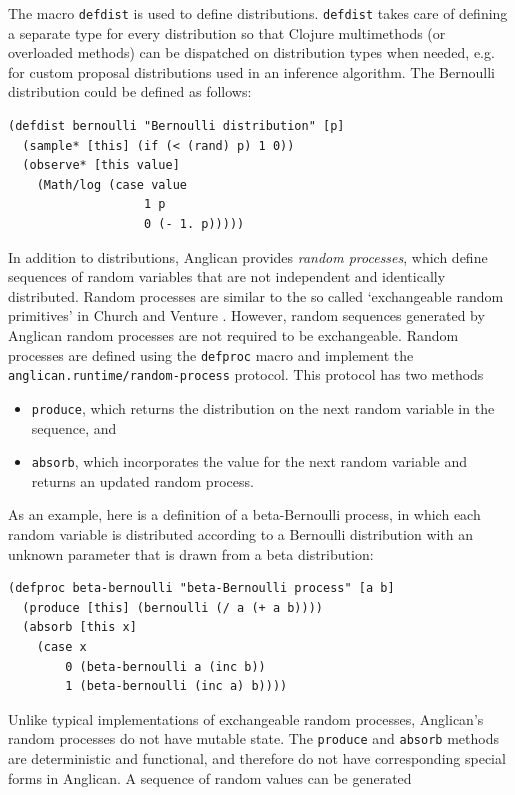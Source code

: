 \documentclass[sigconf]{acmart}
\begin{document}
The macro \texttt{defdist} is used to define distributions.
\texttt{defdist} takes care of defining a separate type
for every distribution so that Clojure multimethods (or overloaded
methods) can be dispatched on
distribution types when needed, e.g. for custom proposal distributions 
used in an inference algorithm. The
Bernoulli distribution could be defined as follows:
\begin{lstlisting}[style=default]
(defdist bernoulli "Bernoulli distribution" [p]
  (sample* [this] (if (< (rand) p) 1 0))
  (observe* [this value]
    (Math/log (case value
                   1 p
                   0 (- 1. p)))))
\end{lstlisting}

In addition to distributions, Anglican provides \textit{random processes},
which define sequences of random variables that are not independent and
identically distributed. Random processes are similar to the so called
`exchangeable random primitives' in Church \cite{GMR+08} and
Venture \cite{MSP14}. However, random sequences generated by Anglican random 
processes are not required to be exchangeable. Random processes are
defined using the \texttt{defproc} macro and implement the
\texttt{anglican.runtime/{\linebreak[0]}random-process} protocol. This
protocol has two methods
\begin{itemize}
\item \texttt{produce}, which returns the distribution on the next
random variable in the sequence, and
\item \texttt{absorb}, which incorporates the value for the next random
variable and returns an updated random process.
\end{itemize}
 As an example, here is a definition of a beta-Bernoulli process, in which
each random variable is distributed according to a Bernoulli distribution with
an unknown parameter that is drawn from a beta distribution:
\begin{lstlisting}[style=default]
(defproc beta-bernoulli "beta-Bernoulli process" [a b]
  (produce [this] (bernoulli (/ a (+ a b))))
  (absorb [this x]
    (case x
        0 (beta-bernoulli a (inc b))
        1 (beta-bernoulli (inc a) b))))
\end{lstlisting}
Unlike typical implementations of exchangeable random processes,
Anglican's random processes do not have mutable state. The
\texttt{produce} and \texttt{absorb} methods are deterministic
and functional, and therefore do not have corresponding special
forms in Anglican. A sequence of random values can be generated
\end{document}
